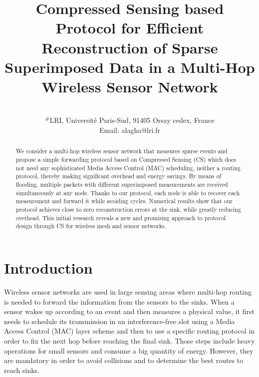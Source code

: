 \documentclass[letterpaper,conference]{IEEEtran}
\begin{document}
\title{Compressed Sensing based Protocol for Efficient Reconstruction of Sparse Superimposed Data in a Multi-Hop Wireless Sensor Network}
\author{\\
$^{\#}$LRI, Universit\'{e} Paris-Sud, 91405 Orsay cedex, France\\
Email: alagha@lri.fr}

\maketitle

\begin{abstract}
We consider a multi-hop wireless sensor network that measures sparse events and propose a simple forwarding protocol based on Compressed Sensing (CS) which does not need any sophisticated Media Access Control (MAC) scheduling, neither a routing protocol, thereby making significant overhead and energy savings. By means of flooding, multiple packets with different superimposed measurements are received simultaneously at any node. Thanks to our protocol, each node is able to recover each measurement and forward it while avoiding cycles. Numerical results show that our protocol achieves close to zero reconstruction errors at the sink, while greatly reducing overhead. This initial research reveals a new and promising approach to protocol design through CS for wireless mesh and sensor networks.


\end{abstract}

\section{Introduction}

Wireless sensor networks are used in large sensing areas where multi-hop routing is needed to forward the information from the sensors to the sinks. When a sensor wakes up according to an event and then measures a physical value, it first needs to schedule its transmission in an interference-free slot using a Media Access Control (MAC) layer scheme and then to use a specific routing protocol in order to fix the next hop before reaching the final sink. Those steps include heavy operations for small sensors and consume a big quantity of energy. However, they are mandatory in order to avoid collisions and to determine the best routes to reach sinks.
\end{document}

